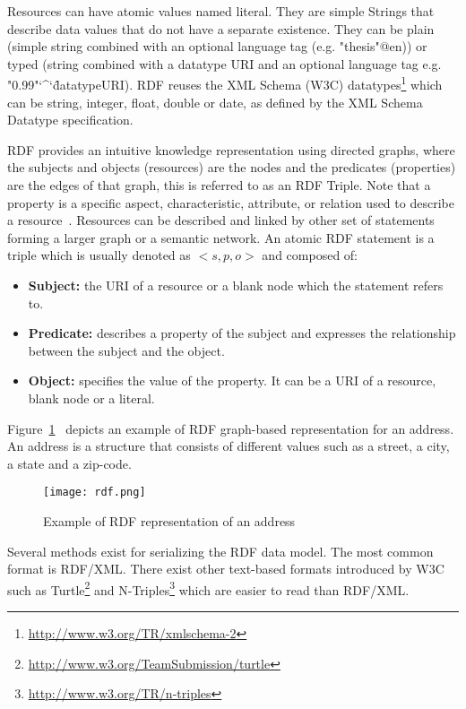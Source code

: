 Resources can have atomic values named literal. They are simple Strings that describe data values that do not have a separate existence. They can be plain (simple string combined with an optional language tag (e.g. "thesis"@en)) or typed (string combined with a datatype URI and an optional language tag e.g. "0.99"\char`\^\char`\^datatypeURI). RDF reuses the  XML Schema (W3C) datatypes\footnote{\url{http://www.w3.org/TR/xmlschema-2}} which can be string, integer, float, double or date, as defined by the XML Schema Datatype specification.

RDF provides an intuitive knowledge representation using directed graphs, where the subjects and objects (resources) are the nodes and the predicates (properties) are the edges of that graph, this is referred to as an RDF Triple. Note that a property is a specific aspect, characteristic, attribute, or relation used to describe a resource~\cite{Lassila:RDF:99}. Resources can be described and linked by other set of statements forming a larger graph or a semantic network. An atomic RDF statement is a triple which is usually denoted as $<s,p,o>$ and composed of:

\begin{itemize}
	\item \textbf{Subject:} the URI of a resource or a blank node which the statement refers to.
	\item \textbf{Predicate:} describes a property of the subject and expresses the relationship between the subject and the object.
	\item \textbf{Object:} specifies the value of the property. It can be a URI of a resource, blank node or a literal.
\end{itemize}

Figure~\ref{fig:rdfGraph}~ depicts an example of RDF graph-based representation for an address. An address is a structure that consists of different values such as a street, a city, a state and a zip-code.

\begin{figure}[htbp]
\centering
	\texttt{[image: rdf.png]}
	\caption{Example of RDF representation of an address}
	\label{fig:rdfGraph}
\end{figure}

Several methods exist for serializing the RDF data model. The most common format is RDF/XML. There exist other text-based formats introduced by W3C such as Turtle\footnote{\url{http://www.w3.org/TeamSubmission/turtle}} and N-Triples\footnote{\url{http://www.w3.org/TR/n-triples}} which are easier to read than RDF/XML.

